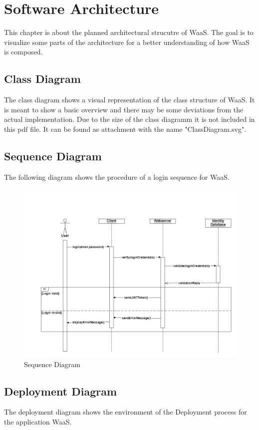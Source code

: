 \documentclass[titlepage, 12pt]{article}
\begin{document}
\section{Software Architecture}
This chapter is about the planned architectural strucutre of WaaS. The goal is to visualize some parts of the architecture for a better understanding of how WaaS is composed.

\subsection{Class Diagram}
The class diagram shows a visual representation of the class structure of WaaS. It is meant to show a basic overview and there may be some deviations from the actual implementation. Due to the size of the class diagramm it is not included in this pdf file. It can be found as attachment with the name "ClassDiagram.svg".

\subsection{Sequence Diagram}
The following diagram shows the procedure of a login sequence for WaaS.

\begin{figure}[H]
  \includegraphics[width=0.95\linewidth]{SequenceDiagram.png}
  \caption{Sequence Diagram}
  \label{fig:sequenceDiagram}
\end{figure}

\subsection{Deployment Diagram}
The deployment diagram shows the environment of the Deployment process for the application WaaS.
\end{document}
